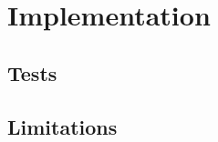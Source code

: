 \chapter{Implementation}
\label{chap:implementation}

\section{Tests}
\label{sec:tests}

\section{Limitations}
\label{sec:limitations}